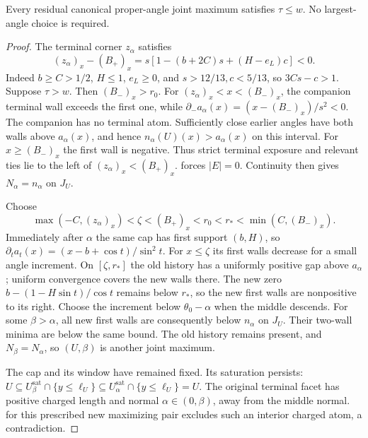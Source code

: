 \begin{lemma}\label{lem:partial-facet}
Every residual canonical proper-angle joint maximum satisfies
$\tau\le w$. No largest-angle choice is required.
\end{lemma}
\begin{proof}
The terminal corner $z_\alpha$ satisfies
\[
 (z_\alpha)_x-(B_+)_x
 =s[1-(b+2C)s+(H-e_L)c]<0.
\]
Indeed $b\ge C>1/2$, $H\le1$, $e_L\ge0$, and
$s>12/13,c<5/13$, so $3Cs-c>1$.
Suppose $\tau>w$. Then $(B_-)_x>r_0$.
For $(z_\alpha)_x<x<(B_-)_x$, the companion terminal wall
exceeds the first one, while
$\partial_-a_\alpha(x)=(x-(B_-)_x)/s^2<0$.
The companion has no terminal atom. Sufficiently close earlier
angles have both walls above $a_\alpha(x)$, and hence
$n_\alpha(U)(x)>a_\alpha(x)$ on this interval.
For $x\ge(B_-)_x$ the first wall is negative.
Thus strict terminal exposure and relevant ties lie to the left
of $(z_\alpha)_x<(B_+)_x$.
 forces $|E|=0$.
Continuity then gives $N_\alpha=n_\alpha$ on $J_U$.

Choose
\[
 \max(-C,(z_\alpha)_x)<\zeta<(B_+)_x<r_0
       <r_*<\min(C,(B_-)_x).
\]
Immediately after $\alpha$ the same cap has first support $(b,H)$,
so $\partial_ta_t(x)=(x-b+\cos t)/\sin^2t$.
For $x\le\zeta$ its first walls decrease for a small angle
increment. On $[\zeta,r_*]$ the old history has a uniformly
positive gap above $a_\alpha$; uniform convergence covers the
new walls there. The new zero
$b-(1-H\sin t)/\cos t$ remains below $r_*$, so the new first
walls are nonpositive to its right. Choose the increment below
$\theta_0-\alpha$ when the middle descends.
For some $\beta>\alpha$, all new first walls are consequently
below $n_\alpha$ on $J_U$. Their two-wall minima are below the
same bound. The old history remains present, and
$N_\beta=N_\alpha$, so $(U,\beta)$ is another joint maximum.

The cap and its window have remained fixed. Its saturation persists:
$U\subseteq U^{\mathrm{sat}}_\beta\cap\{y\le\ell_U\}
\subseteq U^{\mathrm{sat}}_\alpha\cap\{y\le\ell_U\}=U$.
The original terminal facet has positive charged length and normal
$\alpha\in(0,\beta)$, away from the middle normal.
 for this prescribed new maximizing
pair excludes such an interior charged atom, a contradiction.
\end{proof}

